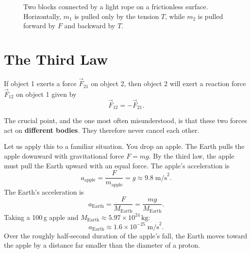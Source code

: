 \begin{figure}[H]
  \centering
  \caption{Two blocks connected by a light rope on a frictionless surface. Horizontally,
  $m_1$ is pulled only by the tension $T$, while $m_2$ is pulled forward by $F$ and backward by $T$.}
\end{figure}


\section{The Third Law}

\begin{keybox}
If object 1 exerts a force $\vec{F}_{21}$ on object 2, then object 2 will exert a reaction
force $\vec{F}_{12}$ on object 1 given by
\begin{equation}
  \vec{F}_{12} = -\vec{F}_{21}.
\end{equation}
\end{keybox}

The crucial point, and the one most often misunderstood, is that these two forces act on
\textbf{different bodies}. They therefore never cancel each other.

Let us apply this to a familiar situation. You drop an apple. The Earth pulls the apple
downward with gravitational force $F=mg$. By the third law, the apple must pull the Earth
upward with an equal force. The apple's acceleration is
\begin{equation}
  a_\text{apple} = \frac{F}{m_\text{apple}} = g \approx 9.8\;\text{m/s}^2.
\end{equation}
The Earth's acceleration is
\begin{equation}
  a_\text{Earth} = \frac{F}{M_\text{Earth}} = \frac{mg}{M_\text{Earth}}.
\end{equation}
Taking a 100\,g apple and $M_\text{Earth}\approx5.97\times10^{24}\,\text{kg}$:
\begin{equation}
  a_\text{Earth} \approx 1.6\times10^{-25}\;\text{m/s}^2.
\end{equation}
Over the roughly half-second duration of the apple's fall, the Earth moves toward the apple
by a distance far smaller than the diameter of a proton.

